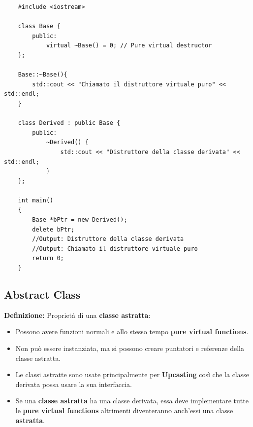 \begin{lstlisting}
	#include <iostream>
	
	class Base {
		public:
			virtual ~Base() = 0; // Pure virtual destructor
	};

	Base::~Base(){
		std::cout << "Chiamato il distruttore virtuale puro" << std::endl;
	}

	class Derived : public Base {
		public:
			~Derived() {
				std::cout << "Distruttore della classe derivata" << std::endl;
			}
	};

	int main()
	{
		Base *bPtr = new Derived();
		delete bPtr;
		//Output: Distruttore della classe derivata
		//Output: Chiamato il distruttore virtuale puro
		return 0;
	}
\end{lstlisting}

\subsection{Abstract Class}

\textsf{\small \textbf{Definizione: } Proprietà di una \textbf{classe astratta}: } \\

\begin{itemize}
	\item \textsf{\small Possono avere funzioni normali e allo stesso tempo \textbf{pure virtual functions}.}
	\item \textsf{\small Non può essere instanziata, ma si possono creare puntatori e referenze della classe astratta.}
	\item \textsf{\small Le classi astratte sono usate principalmente per \textbf{Upcasting} così che la classe derivata possa usare la sua interfaccia.}
	\item \textsf{\small Se una \textbf{classe astratta} ha una classe derivata, essa deve implementare tutte le \textbf{pure virtual functions} altrimenti diventeranno anch'essi una classe \textbf{astratta}.}
\end{itemize}

